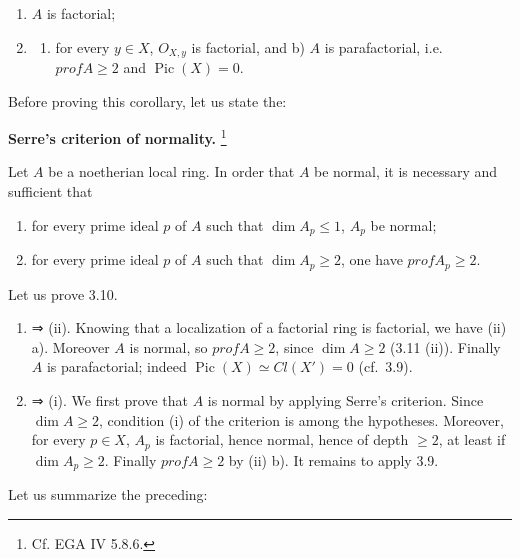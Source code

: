 \documentclass[
]{article}
\providecommand{\tightlist}{%
  \setlength{\itemsep}{0pt}\setlength{\parskip}{0pt}}
\begin{document}
\begin{enumerate}
\def\labelenumi{\arabic{enumi}.}
\tightlist
\item
  \(A\) is factorial;
\item
  \begin{enumerate}
  \def\labelenumii{\alph{enumii})}
  \tightlist
  \item
    for every \(y \in X\), \(O_{X,y}\) is factorial, and b) \(A\) is
    parafactorial, i.e.~\(prof A \geqslant 2\) and
    \(\operatorname{Pic}(X) = 0\).
  \end{enumerate}
\end{enumerate}

Before proving this corollary, let us state the:

\textbf{Serre's criterion of normality.} \footnote{Cf. EGA IV 5.8.6.}

Let \(A\) be a noetherian local ring. In order that \(A\) be normal, it
is necessary and sufficient that

\begin{enumerate}
\def\labelenumi{\arabic{enumi}.}
\tightlist
\item
  for every prime ideal \(p\) of \(A\) such that
  \(\dim A_{p} \leqslant 1\), \(A_{p}\) be normal;
\item
  for every prime ideal \(p\) of \(A\) such that
  \(\dim A_{p} \geqslant 2\), one have \(prof A_{p} \geqslant 2\).
\end{enumerate}

Let us prove 3.10.

\begin{enumerate}
\def\labelenumi{(\roman{enumi})}
\item
  ⇒ (ii). Knowing that a localization of a factorial ring is factorial,
  we have (ii) a). Moreover \(A\) is normal, so \(prof A \geqslant 2\),
  since \(\dim A \geqslant 2\) (3.11 (ii)). Finally \(A\) is
  parafactorial; indeed \(\operatorname{Pic}(X) \simeq Cl(X') = 0\)
  (cf.~3.9).
\item
  ⇒ (i). We first prove that \(A\) is normal by applying Serre's
  criterion. Since \(\dim A \geqslant 2\), condition (i) of the
  criterion is among the hypotheses. Moreover, for every \(p \in X\),
  \(A_{p}\) is factorial, hence normal, hence of depth \(\geqslant 2\),
  at least if \(\dim A_{p} \geqslant 2\). Finally \(prof A \geqslant 2\)
  by (ii) b). It remains to apply 3.9.
\end{enumerate}

Let us summarize the preceding:
\end{document}
